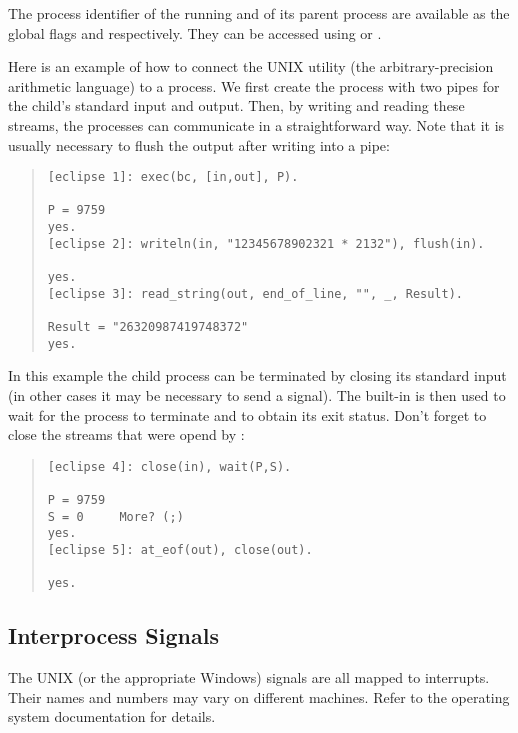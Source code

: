 The process identifier of the running {\eclipse} and of its parent process are
available as the global flags
and
respectively.
They can be accessed using
 or
.

Here is an example of how to connect the UNIX utility  (the
arbitrary-precision arithmetic language) to a {\eclipse} process.
We first create the process with two pipes for the child's standard input
and output.
Then, by writing and reading these streams, the processes can communicate in
a straightforward way. Note that it is usually necessary to flush the
output after writing into a pipe:
\begin{quote}
\begin{verbatim}
[eclipse 1]: exec(bc, [in,out], P).

P = 9759
yes.
[eclipse 2]: writeln(in, "12345678902321 * 2132"), flush(in).

yes.
[eclipse 3]: read_string(out, end_of_line, "", _, Result).

Result = "26320987419748372"
yes.
\end{verbatim}
\end{quote}
In this example the child process can be terminated by closing its standard
input (in other cases it may be necessary to send a signal).
The built-in  is then used to
wait for the process to terminate
and to obtain its exit status.
Don't forget to close the {\eclipse} streams that were opend by
:
\begin{quote}
\begin{verbatim}
[eclipse 4]: close(in), wait(P,S).

P = 9759
S = 0     More? (;)
yes.
[eclipse 5]: at_eof(out), close(out).

yes.
\end{verbatim}
\end{quote}

\subsection{Interprocess Signals}
The UNIX (or the appropriate Windows) signals are all mapped to {\eclipse}
interrupts.
Their names and numbers may vary on different machines.
Refer to the operating system documentation for details.

